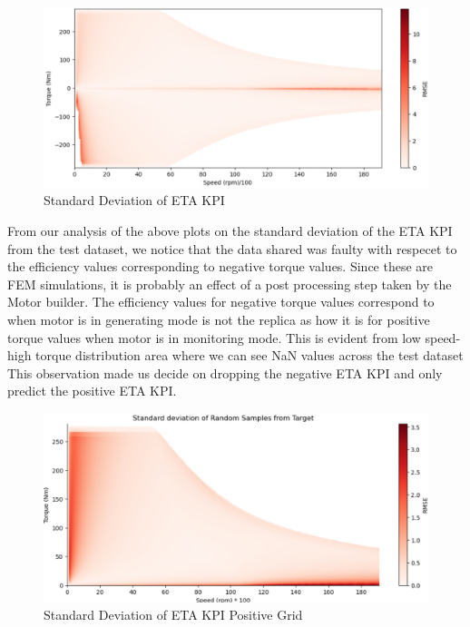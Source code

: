 \documentclass{report} %
\begin{document}
\begin{figure}[H]
    \centering
    \includegraphics[width=1\textwidth]{./ReportImages/stddev_y2.png} 
    \caption{Standard Deviation of ETA \ac{KPI}} 
    \label{fig:Standard Deviation of 3D KPI(ETA)}
\end{figure}


From our analysis of the above plots on the standard deviation of the ETA \ac{KPI} from the test dataset, we notice that the data shared was faulty with respecet to the efficiency values corresponding to negative torque values.
Since these are FEM simulations, it is probably an effect of a post processing step taken by the Motor builder.
The efficiency values for negative torque values correspond to when motor is in generating mode is not the replica as how it is for positive torque values when motor is in monitoring mode. 
This is evident from low speed-high torque distribution area where we can see \ac{NaN} values across the test dataset\\

This observation made us decide on dropping the negative ETA \ac{KPI} and only predict the positive ETA \ac{KPI}.

\begin{figure}[H]
    \centering
    \includegraphics[width=1\textwidth]{./ReportImages/pos_stddev_y2.png} 
    \caption{Standard Deviation of ETA \ac{KPI} Positive Grid} 
    \label{fig:Standard Deviation of 3D KPI(ETA) Positive Grid}
\end{figure}
\end{document}
